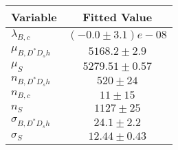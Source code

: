 \begin{tabular}[t]{lc}
\hline
Variable &Fitted Value\\
\hline\hline
$\lambda_{B,c}$&$(-0.0\pm3.1)e-08$\\
\hline
$\mu_{B, D^* D_s h}$&$5168.2\pm2.9$\\
\hline
$\mu_S$&$5279.51\pm0.57$\\
\hline
$n_{B, D^* D_s h}$&$520\pm24$\\
\hline
$n_{B,c}$&$11\pm15$\\
\hline
$n_S$&$1127\pm25$\\
\hline
$\sigma_{B, D^* D_s h}$&$24.1\pm2.2$\\
\hline
$\sigma_S$&$12.44\pm0.43$\\
\hline
\end{tabular}